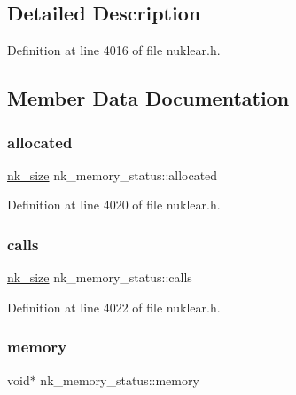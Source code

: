 \subsection{Detailed Description}


Definition at line 4016 of file nuklear.\+h.



\subsection{Member Data Documentation}
\mbox{\label{structnk__memory__status_a3fc6ed3975955adc725902ef3202eda5}} 
\subsubsection{\texorpdfstring{allocated}{allocated}}
{\footnotesize\ttfamily \mbox{\hyperlink{nuklear_8h_a84c0fc50dec5501be327b33d41d9010c}{nk\+\_\+size}} nk\+\_\+memory\+\_\+status\+::allocated}



Definition at line 4020 of file nuklear.\+h.

\mbox{\label{structnk__memory__status_a9ccd108a6be26c752346353c81dafcd8}} 
\subsubsection{\texorpdfstring{calls}{calls}}
{\footnotesize\ttfamily \mbox{\hyperlink{nuklear_8h_a84c0fc50dec5501be327b33d41d9010c}{nk\+\_\+size}} nk\+\_\+memory\+\_\+status\+::calls}



Definition at line 4022 of file nuklear.\+h.

\mbox{\label{structnk__memory__status_a59d1cb36709894b5f922a1d4cf057051}} 
\subsubsection{\texorpdfstring{memory}{memory}}
{\footnotesize\ttfamily void$\ast$ nk\+\_\+memory\+\_\+status\+::memory}



